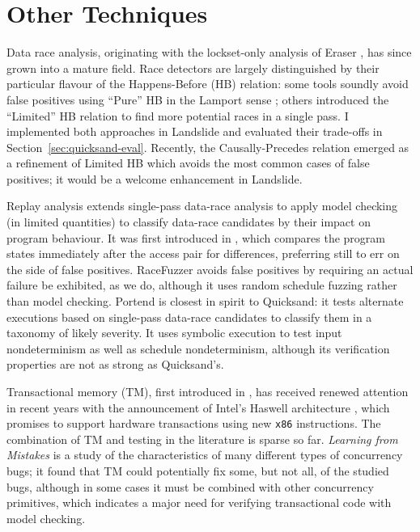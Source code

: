 \section{Other Techniques}

Data race analysis, originating with the lockset-only analysis of Eraser \cite{eraser},
has since grown into a mature field.
Race detectors are largely distinguished by their particular flavour of the Happens-Before (HB) relation:
some tools \cite{fasttrack,djit} soundly avoid false positives using ``Pure'' HB in the Lamport sense \cite{lamport-clocks};
others \cite{tsan,hybriddatarace} introduced the ``Limited'' HB relation to find more potential races in a single pass.
I implemented both approaches in Landslide and evaluated their trade-offs in Section~\ref{sec:quicksand-eval}.
%
Recently, the Causally-Precedes relation \cite{predictive-dr} emerged as a refinement of Limited HB which avoids the most common cases of false positives; it would be a welcome enhancement in Landslide.

Replay analysis extends single-pass data-race analysis to apply model checking (in limited quantities) to classify data-race candidates by their impact on program behaviour.
It was first introduced in \cite{recordreplaydrs}, which compares the program states immediately after the access pair for differences, preferring still to err on the side of false positives.
RaceFuzzer \cite{racefuzzer} avoids false positives by requiring an actual failure be exhibited, as we do,
although it uses random schedule fuzzing rather than model checking.
%
Portend \cite{portend} is closest in spirit to Quicksand:
it tests alternate executions based on single-pass data-race candidates to classify them in a taxonomy of likely severity.
It uses symbolic execution to test input nondeterminism as well as schedule nondeterminism,
although its verification properties are not as strong as Quicksand's.


Transactional memory (TM), first introduced in \cite{transactional-memory},
has received renewed attention in recent years with the announcement of Intel's Haswell architecture \cite{htm-haswell},
which promises to support hardware transactions using new {\tt x86} instructions.
%
The combination of TM and testing in the literature is sparse so far.
{\em Learning from Mistakes} \cite{learning-from-mistakes} is a study of the characteristics of many different types of concurrency bugs;
it found that TM could potentially fix some, but not all, of the studied bugs,
although in some cases it must be combined with other concurrency primitives,
which indicates a major need for verifying transactional code with model checking.
